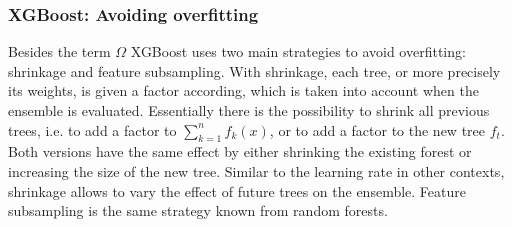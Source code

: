 \subsubsection{XGBoost: Avoiding overfitting}
Besides the term $\Omega$ XGBoost uses two main strategies to avoid overfitting: shrinkage and feature subsampling. With shrinkage, each tree, or more precisely its weights, is given a factor according, which is taken into account when the ensemble is evaluated. Essentially there is the possibility to shrink all previous trees, i.e. to add a factor to $\sum\limits_{k=1}^n f_k(x)$, or to add a factor to the new tree $f_t$. Both versions have the same effect by either shrinking the existing forest or increasing the size of the new tree. Similar to the learning rate in other contexts, shrinkage allows to vary the effect of future trees on the ensemble. Feature subsampling is the same strategy known from random forests.

